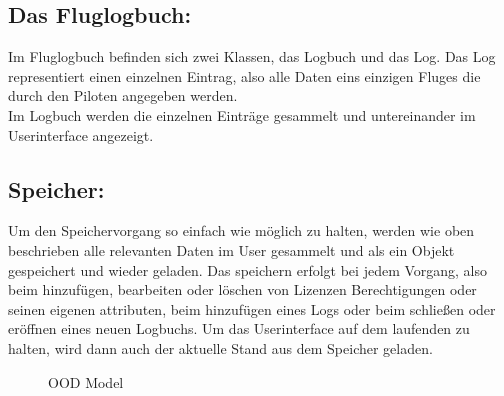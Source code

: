 \documentclass[a4paper]{article} %
\begin{document}
    \subsection{Das Fluglogbuch:}
    Im Fluglogbuch befinden sich zwei Klassen, das Logbuch und das Log. Das Log representiert einen einzelnen Eintrag, also alle Daten eins einzigen Fluges die durch den Piloten angegeben werden.\\
    Im Logbuch werden die einzelnen Einträge gesammelt und untereinander im Userinterface angezeigt. \\
    \subsection{Speicher:}
    Um den Speichervorgang so einfach wie möglich zu halten, werden wie oben beschrieben alle relevanten Daten im User gesammelt und als ein Objekt gespeichert und wieder geladen. Das speichern erfolgt bei jedem Vorgang, also beim hinzufügen, bearbeiten oder löschen von Lizenzen Berechtigungen oder seinen eigenen attributen, beim hinzufügen eines Logs oder beim schließen oder eröffnen eines neuen Logbuchs. Um das Userinterface auf dem laufenden zu halten, wird dann auch der aktuelle Stand aus dem Speicher geladen.
    \pagebreak
    
    \begin{figure}[h!]
    \centering
    \caption{OOD Model}
    \label{fig:my_label}
    \end{figure}
    \pagebreak
\end{document}
